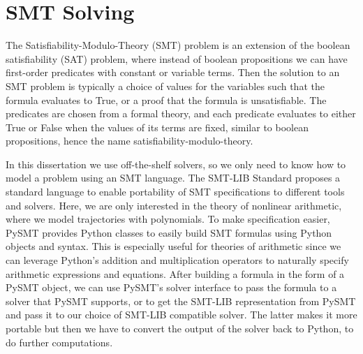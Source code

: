 \section{SMT Solving}
The Satisfiability-Modulo-Theory (SMT) problem is an extension of the boolean satisfiability (SAT) problem, where instead of boolean propositions we can have first-order predicates with constant or variable terms.
%
Then the solution to an SMT problem is typically a choice of values for the variables such that the formula evaluates to True, or a proof that the formula is unsatisfiable.
%
The predicates are chosen from a formal theory, and each predicate evaluates to either True or False when the values of its terms are fixed, similar to boolean propositions, hence the name satisfiability-modulo-theory.



In this dissertation we use off-the-shelf solvers, so we only need to know how to model a problem using an SMT language.
%
The SMT-LIB Standard \cite{Barrett.2010} proposes a standard language to enable portability of SMT specifications to different tools and solvers.
%
Here, we are only interested in the theory of nonlinear arithmetic, where we model trajectories with polynomials.
%
To make specification easier, PySMT \cite{PySMT.2015} provides Python classes to easily build SMT formulas using Python objects and syntax.
%
This is especially useful for theories of arithmetic since we can leverage Python's addition and multiplication operators to naturally specify arithmetic expressions and equations.
%
After building a formula in the form of a PySMT object, we can use PySMT's solver interface to pass the formula to a solver that PySMT supports, or to get the SMT-LIB representation from PySMT and pass it to our choice of SMT-LIB compatible solver.
%
The latter makes it more portable but then we have to convert the output of the solver back to Python, to do further computations.

